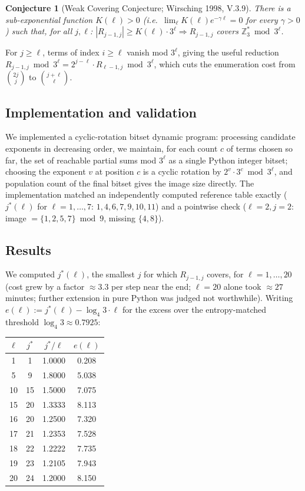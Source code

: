 \documentclass[11pt]{article}
\newtheorem{conjecture}[theorem]{Conjecture}
\theoremstyle{definition}
\theoremstyle{remark}
\begin{document}
\begin{conjecture}[Weak Covering Conjecture; Wirsching 1998, V.3.9]
\label{conj:wcc}
There is a sub-exponential function $K(\ell)>0$ (i.e.\
$\lim_\ell K(\ell)e^{-\gamma\ell}=0$ for every $\gamma>0$) such that,
for all $j,\ell$: $|R_{j-1,j}|\ge K(\ell)\cdot 3^\ell \Rightarrow
R_{j-1,j}$ covers $\mathbb{Z}_3^\ast \bmod 3^\ell$.
\end{conjecture}

For $j\ge \ell$, terms of index $i\ge\ell$ vanish mod $3^\ell$, giving
the useful reduction $R_{j-1,j}\bmod 3^\ell = 2^{j-\ell}\cdot
R_{\ell-1,j}\bmod 3^\ell$, which cuts the enumeration cost from
$\binom{2j}{j}$ to $\binom{j+\ell}{\ell}$.

\subsection{Implementation and validation}

We implemented a cyclic-rotation bitset dynamic program: processing
candidate exponents in decreasing order, we maintain, for each count
$c$ of terms chosen so far, the set of reachable partial sums mod
$3^\ell$ as a single Python integer bitset; choosing the exponent $v$
at position $c$ is a cyclic rotation by $2^v\cdot 3^c\bmod 3^\ell$, and
population count of the final bitset gives the image size directly.
The implementation matched an independently computed reference table
exactly ($j^\ast(\ell)$ for $\ell=1,\dots,7$: $1,4,6,7,9,10,11$) and a
pointwise check ($\ell=2,j=2$: image $=\{1,2,5,7\}\bmod 9$, missing
$\{4,8\}$).

\subsection{Results}

We computed $j^\ast(\ell)$, the smallest $j$ for which $R_{j-1,j}$
covers, for $\ell=1,\dots,20$ (cost grew by a factor $\approx 3.3$ per
step near the end; $\ell=20$ alone took $\approx 27$ minutes; further
extension in pure Python was judged not worthwhile). Writing
$e(\ell):=j^\ast(\ell)-\log_4 3\cdot\ell$ for the excess over the
entropy-matched threshold $\log_4 3\approx 0.7925$:

\begin{center}
\begin{tabular}{c|c|c|c}
$\ell$ & $j^\ast$ & $j^\ast/\ell$ & $e(\ell)$ \\ \hline
1 & 1 & 1.0000 & 0.208 \\
5 & 9 & 1.8000 & 5.038 \\
10 & 15 & 1.5000 & 7.075 \\
15 & 20 & 1.3333 & 8.113 \\
16 & 20 & 1.2500 & 7.320 \\
17 & 21 & 1.2353 & 7.528 \\
18 & 22 & 1.2222 & 7.735 \\
19 & 23 & 1.2105 & 7.943 \\
20 & 24 & 1.2000 & 8.150
\end{tabular}
\end{center}
\end{document}
